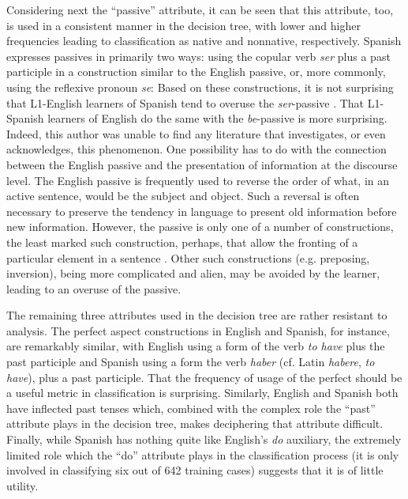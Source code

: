 \documentclass[main.tex]{subfiles}
\begin{document}
Considering next the ``passive'' attribute, it can be seen that this attribute, too, is used in a consistent manner in the decision tree, with lower and higher frequencies leading to classification as native and nonnative, respectively. Spanish expresses passives in primarily two ways: using the copular verb \textit{ser} plus a past participle in a construction similar to the English passive, or, more commonly, using the reflexive pronoun \textit{se}:
Based on these constructions, it is not surprising that L1-English learners of Spanish tend to overuse the \textit{ser}-passive \citep[ch. 28.2.3]{butt}. That L1-Spanish learners of English do the same with the \textit{be}-passive is more surprising. Indeed, this author was unable to find any literature that investigates, or even acknowledges, this phenomenon. One possibility has to do with the connection between the English passive and the presentation of information at the discourse level. The English passive is frequently used to reverse the order of what, in an active sentence, would be the subject and object. Such a reversal is often necessary to preserve the tendency in language to present old information before new information. However, the passive is only one of a number of constructions, the least marked such construction, perhaps, that allow the fronting of a particular element in a sentence \citep{ward:2008}. Other such constructions (e.g. preposing, inversion), being more complicated and alien, may be avoided by the learner, leading to an overuse of the passive.

The remaining three attributes used in the decision tree are rather resistant to analysis. The perfect aspect constructions in English and Spanish, for instance, are remarkably similar, with English using a form of the verb \textit{to have} plus the past participle and Spanish using a form the verb \textit{haber} (cf. Latin \textit{habere}, \textit{to have}), plus a past participle. That the frequency of usage of the perfect should be a useful metric in classification is surprising. Similarly, English and Spanish both have inflected past tenses which, combined with the complex role the ``past'' attribute plays in the decision tree, makes deciphering that attribute difficult. Finally, while Spanish has nothing quite like English's \textit{do} auxiliary, the extremely limited role which the ``do'' attribute plays in the classification process (it is only involved in classifying six out of 642 training cases) suggests that it is of little utility.
\end{document}
